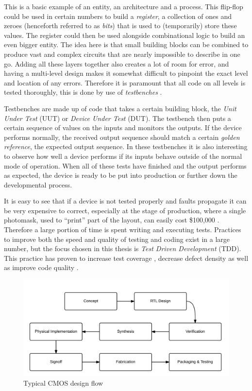 \documentclass[11pt,british]{article}
\begin{document}
This is a basic example of an entity, an architecture and a process.
This flip-flop could be used in certain numbers to build a \emph{register},
a collection of ones and zeroes (henceforth referred to as \emph{bits}) that
is used to (temporarily) store these values. The register could then
be used alongside combinational logic to build an even bigger entity.
The idea here is that small building blocks can be combined to produce
vast and complex circuits that are nearly impossible to describe in
one go. Adding all these layers together also creates a lot of room
for error, and having a multi-level design makes it somewhat difficult
to pinpoint the exact level and location of any errors. Therefore
it is paramount that all code on all levels is tested thoroughly,
this is done by use of \emph{testbenches} \cite{key-2}.

Testbenches are made up of code that takes a certain building block,
the \emph{Unit Under Test} (UUT) or \emph{Device Under Test} (DUT).
The testbench then puts a certain sequence of values on the inputs and monitors
the outputs. If the device performs normally, the received output
sequence should match a certain \emph{golden reference}, the expected
output sequence. In these testbenches it is also interesting to observe
how well a device performs if its inputs behave outside of the normal
mode of operation. When all of these tests have finished and the output
performs as expected, the device is ready to be put into production
or further down the developmental process.

It is easy to see that if a device is not tested properly and faults
propagate it can be very expensive to correct, especially at the stage
of production, where a single photomask, used to ``print'' part
of the layout, can easily cost \$100,000 \cite{key-3}. Therefore a
large portion of time is spent writing and executing tests\cite{key-4}.
Practices to improve both the speed and quality of testing and coding
exist in a large number, but the focus chosen in this thesis is \emph{Test
Driven Development} (TDD). This practice has proven to increase test
coverage \cite{key-5}, decrease defect density \cite{key-8} as well
as improve code quality \cite{key-8,key-9}.

\begin{figure}[h]
    \centering
	\includegraphics[width=\textwidth]{images/Design_Flow.png}
    \caption{Typical CMOS design flow}
    \label{fig:Design_Flow}
\end{figure}
\end{document}
